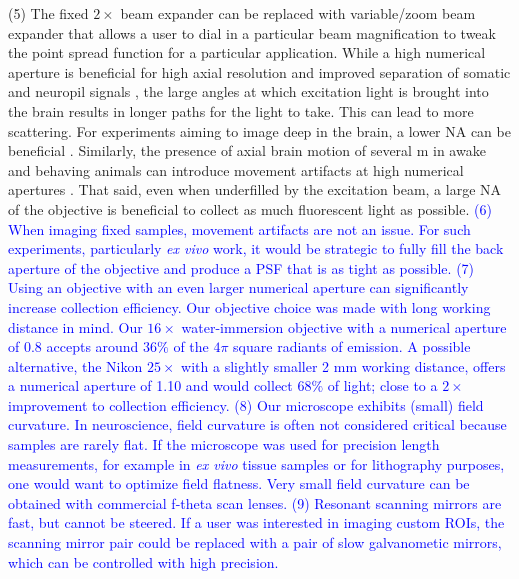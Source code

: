 \documentclass[10pt,letterpaper]{article}
\begin{document}
(5) The fixed $2\times$ beam expander can be replaced with variable/zoom beam expander that allows a user to dial in a particular beam magnification to tweak the point spread function for a particular application\cite{Smith2019}. While a high numerical aperture is beneficial for high axial resolution and improved separation of somatic and neuropil signals \cite{Kerr2008, Gobel2007}, the large angles at which excitation light is brought into the brain results in longer paths for the light to take. This can lead to more scattering. For experiments aiming to image deep in the brain, a lower NA can be beneficial \cite{Tung2004}. Similarly, the presence of axial brain motion of several \textmu m in awake and behaving animals can introduce movement artifacts at high numerical apertures \cite{Dombeck2007}. That said, even when underfilled by the excitation beam, a large NA of the objective is beneficial to collect as much fluorescent light as possible.\newline
\textcolor{blue}{(6) When imaging fixed samples, movement artifacts are not an issue. For such experiments, particularly \textit{ex vivo} work, it would be strategic to fully fill the back aperture of the objective and produce a PSF that is as tight as possible.}\newline
\textcolor{blue}{(7) Using an objective with an even larger numerical aperture can significantly increase collection efficiency. Our objective choice was made with long working distance in mind. Our $16\times$ water-immersion objective with a numerical aperture of 0.8 accepts around $36\%$ of the $4\pi$ square radiants of emission. A possible alternative, the Nikon $25\times$ with a slightly smaller 2 mm working distance, offers a numerical aperture of 1.10 and would collect $68\%$ of light; close to a $2\times$ improvement to collection efficiency.}\newline
\textcolor{blue}{(8) Our microscope exhibits (small) field curvature. In neuroscience, field curvature is often not considered critical because samples are rarely flat. If the microscope was used for precision length measurements, for example in \textit{ex vivo} tissue samples or for lithography purposes, one would want to optimize field flatness. Very small field curvature can be obtained with commercial f-theta scan lenses.}\newline
\textcolor{blue}{(9) Resonant scanning mirrors are fast, but cannot be steered. If a user was interested in imaging custom ROIs, the scanning mirror pair could be replaced with a pair of slow galvanometic mirrors, which can be controlled with high precision.}\newline
\end{document}
